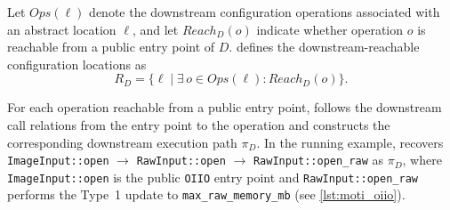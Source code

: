 
Let $\mathit{Ops}(\ell)$ denote the downstream configuration operations associated with an abstract location $\ell$, and let $\mathit{Reach}_D(o)$ indicate whether operation $o$ is reachable from a public entry point of $D$. \sys defines the downstream-reachable configuration locations as
\[
R_{D}
=
\{\ell \mid \exists\, o \in \mathit{Ops}(\ell):
\mathit{Reach}_D(o)\}.
\]


For each operation reachable from a public entry point, \sys follows the downstream call relations from the entry point to the operation and constructs the corresponding downstream execution path $\pi_D$.
In the running example, \sys recovers 
\texttt{ImageInput::open}
$\rightarrow$
\texttt{RawInput::open}
$\rightarrow$
\texttt{RawInput::open\_raw}
as $\pi_D$, where
\texttt{ImageInput::open} is the public \texttt{OIIO} entry point and
\texttt{RawInput::open\_raw} performs the Type~1 update to
\texttt{max\_raw\_memory\_mb} (see \autoref{lst:moti_oiio}).


